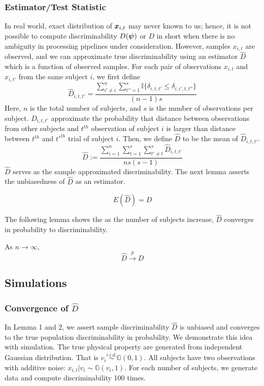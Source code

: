 \documentclass{article}
\begin{document}
\subsubsection{Estimator/Test Statistic}
In real world, exact distribution of $\boldsymbol{x}_{i,t}$ may never known to us; hence, it is not possible to compute discriminability $D(\boldsymbol{\psi})$ or $D$ in short when there is no ambiguity in processing pipelines under consideration. However, samples $x_{i,t}$ are observed, and we can approximate true discriminability using an estimator $\hat{D}$ which is a function of observed samples. For each pair of observations $x_{i,t}$ and $x_{i,t'}$ from the same subject $i$, we first define
\[ \hat{D}_{i,t,t'} = \frac{\sum\limits_{i' \neq i}^{n} \sum\limits_{t''=1}^{s} \mathbb{I}\{\delta_{i,t,t'} \leq \delta_{i,i',t,t''} \} }{(n-1)s}\]
Here, $n$ is the total number of subjects, and $s$ is the number of observations per subject. $\hat{D}_{i,t,t'}$ approximate the probability that distance between observations from other subjects and $t^{th}$ observation of subject $i$ is larger than distance between $t^{th}$ and $t'^{th}$ trial of subject $i$. Then, we define $\hat{D}$ to be the mean of $\hat{D}_{i,t,t'}$.
\[ \hat{D} := \frac{\sum\limits_{i=1}^{n} \sum\limits_{t=1}^{s}  \sum\limits_{t' \neq t}^{s} \hat{D}_{i,t,t'}}{ns(s-1)} \]
$\hat{D}$ serves as the sample approximated discriminability. The next lemma asserts the unbiasedness of $\hat{D}$ as an estimator.

\begin{lem}	
	\[ E(\hat{D}) = D\]
\end{lem}

The following lemma shows the as the number of subjects increase, $\hat{D}$ converges in probability to discriminability.
\begin{lem}	
As $n \rightarrow \infty$,
\[\hat{D} \overset{p}{\rightarrow} D \]
\end{lem}

\subsection{Simulations}

\subsubsection{Convergence of $\hat{D}$}
In Lemma 1 and 2, we assert sample discriminability $\hat{D}$ is unbiased and converges to  the true population discriminability in probability. We demonstrate this idea with simulation. The true physical property are generated from independent Gaussian distribution. That is $v_i \overset{i.i.d.}{\sim} \mathbb{G}(0,1)$. All subjects have two observations with additive noise: $x_{i,t} | v_i \sim \mathbb{G}(v_i,1)$. For each number of subjects, we generate data and compute discriminability 100 times. 
\end{document}
